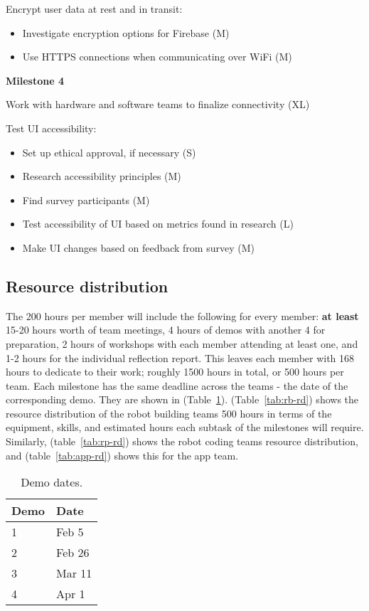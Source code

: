 \documentclass{article}
\begin{document}
Encrypt user data at rest and in transit:
\begin{itemize}
\item Investigate encryption options for Firebase (M)
\item Use HTTPS connections when communicating over WiFi (M)
\end{itemize}

{\bf Milestone 4}

Work with hardware and software teams to finalize connectivity (XL)

Test UI accessibility:
\begin{itemize}
\item Set up ethical approval, if necessary (S)
\item Research accessibility principles (M)
\item Find survey participants (M)
\item Test accessibility of UI based on metrics found in research (L)
\item Make UI changes based on feedback from survey (M)
\end{itemize}

\subsection{Resource distribution}

The 200 hours per member will include the following for every member: {\bf at least} 15-20 hours worth of team meetings, 4 hours of demos with another 4 for preparation, 2 hours of workshops with each member attending at least one, and 1-2 hours for the individual reflection report. This leaves each member with 168 hours to dedicate to their work; roughly 1500 hours in total, or 500 hours per team. Each milestone has the same deadline across the teams - the date of the corresponding demo. They are shown in (Table~\ref{tab:demo-dates}). (Table~\ref{tab:rb-rd}) shows the resource distribution of the robot building teams 500 hours in terms of the equipment, skills, and estimated hours each subtask of the milestones will require. Similarly, (table~\ref{tab:rp-rd}) shows the robot coding teams resource distribution, and (table~\ref{tab:app-rd}) shows this for the app team.
\begin{table}[]
  \begin{center}
  \begin{tabular}{ll}
    \hline
    Demo & Date   \\
    \hline
    1 & Feb 5 \\
    2 & Feb 26 \\
    3 & Mar 11 \\
    4 & Apr 1\\ \hline
  \end{tabular}
  \end{center}
  \caption{Demo dates.}
  \label{tab:demo-dates}
\end{table}
\end{document}

